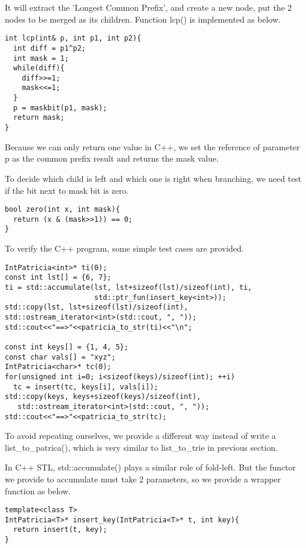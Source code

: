 \documentclass{article}
\begin{document}
It will extract the 'Longest Common Prefix', and create a new node, put
the 2 nodes to be merged as its children. Function lcp() is implemented
as below.

\begin{lstlisting}
int lcp(int& p, int p1, int p2){
  int diff = p1^p2;
  int mask = 1;
  while(diff){
    diff>>=1;
    mask<<=1;
  }
  p = maskbit(p1, mask);
  return mask;
}
\end{lstlisting}

Because we can only return one value in C++, we set the reference of 
parameter p as the common prefix result and returns the mask value.

To decide which child is left and which one is right when branching,
we need test if the bit next to mask bit is zero. 

\begin{lstlisting}
bool zero(int x, int mask){
  return (x & (mask>>1)) == 0;
}
\end{lstlisting}

To verify the C++ program, some simple test cases are provided.

\begin{lstlisting}
IntPatricia<int>* ti(0);
const int lst[] = {6, 7};
ti = std::accumulate(lst, lst+sizeof(lst)/sizeof(int), ti, 
                     std::ptr_fun(insert_key<int>));
std::copy(lst, lst+sizeof(lst)/sizeof(int),
std::ostream_iterator<int>(std::cout, ", "));
std::cout<<"==>"<<patricia_to_str(ti)<<"\n";

const int keys[] = {1, 4, 5};
const char vals[] = "xyz";
IntPatricia<char>* tc(0);
for(unsigned int i=0; i<sizeof(keys)/sizeof(int); ++i)
  tc = insert(tc, keys[i], vals[i]);
std::copy(keys, keys+sizeof(keys)/sizeof(int),
   std::ostream_iterator<int>(std::cout, ", "));
std::cout<<"==>"<<patricia_to_str(tc);
\end{lstlisting}

To avoid repeating ourselves, we provide a different way instead of
write a list\_to\_patrica(), which is very similar to list\_to\_trie
in previous section.

In C++ STL, std::accumulate() plays a similar role of fold-left. But the
functor we provide to accumulate must take 2 parameters, so we provide a 
wrapper function as below.

\begin{lstlisting}
template<class T>
IntPatricia<T>* insert_key(IntPatricia<T>* t, int key){
  return insert(t, key);
}
\end{lstlisting}
\end{document}
